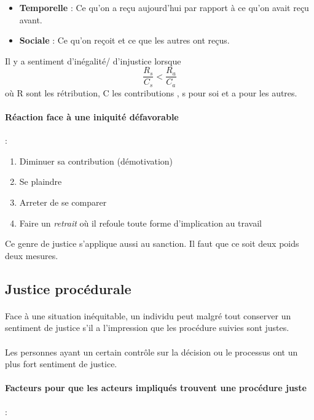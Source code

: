 \documentclass[11pt]{article} %
\begin{document}
\begin{itemize}
	\item \textbf{Temporelle} : Ce qu'on a reçu aujourd'hui par rapport à
        ce qu'on avait reçu avant.
	\item \textbf{Sociale} : Ce qu'on reçoit et ce que les autres ont
        reçus.
\end{itemize}

Il y a sentiment d'inégalité/ d'injustice lorsque
$$\frac{R_s}{C_s}<\frac{R_a}{C_a}$$ où R sont les rétribution, C les
contributions , s pour soi et a pour les autres. 


\paragraph{Réaction face à une iniquité défavorable} :
\begin{enumerate}
    \item Diminuer sa contribution (démotivation)
    \item Se plaindre
    \item Arreter de se comparer
    \item Faire un \textit{retrait} où il refoule toute forme
        d'implication au travail
\end{enumerate}

Ce genre de justice s'applique aussi au sanction. Il faut que ce soit
deux poids deux mesures.


\subsection{Justice procédurale}

\paragraph{ }Face à une situation inéquitable, un individu peut
malgré tout conserver un sentiment de justice s'il a l'impression que
les procédure suivies sont justes.

\paragraph{ } Les personnes ayant un certain contrôle sur la décision
ou le processus ont un plus fort sentiment de justice.

\paragraph{Facteurs pour que les acteurs impliqués trouvent une
procédure juste} :
\end{document}
